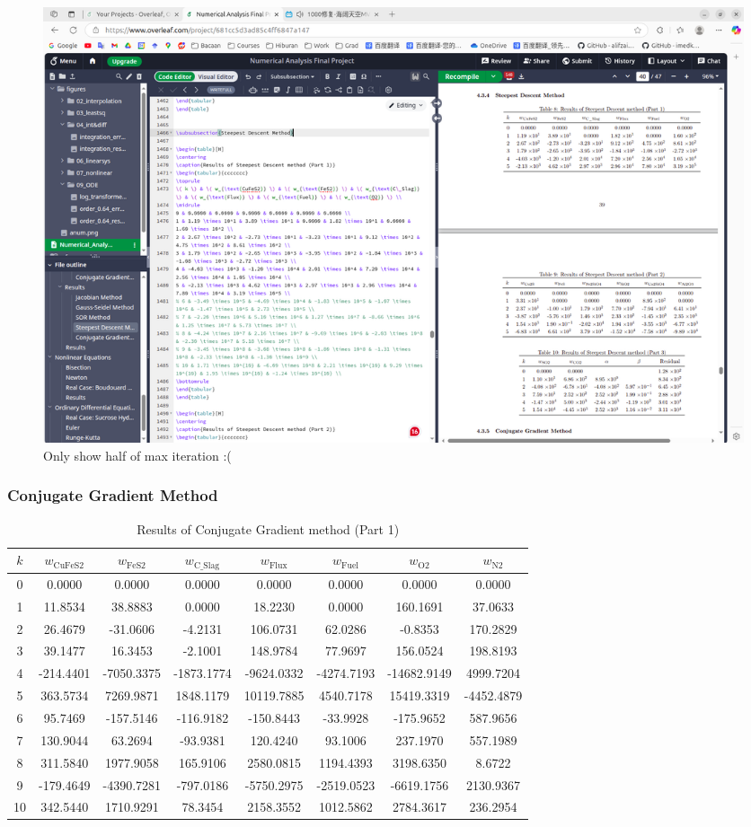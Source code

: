 \documentclass[10pt]{article}
\begin{document}
\begin{figure}[H]
    \centering
    \includegraphics[width=\linewidth]{figures/06_linearsys/Screenshot from 2025-05-18 19-59-09.png}
    \caption{Only show half of max iteration :(}
    \label{fig:enter-label}
\end{figure}




\subsubsection{Conjugate Gradient Method}


\begin{table}[H]
\centering
\caption{Results of Conjugate Gradient method (Part 1)}
\begin{tabular}{cccccccc}
\toprule
\( k \) & \( w_{\text{CuFeS2}} \) & \( w_{\text{FeS2}} \) & \( w_{\text{C\_Slag}} \) & \( w_{\text{Flux}} \) & \( w_{\text{Fuel}} \) & \( w_{\text{O2}} \) & \( w_{\text{N2}} \) \\
\midrule
0 & 0.0000 & 0.0000 & 0.0000 & 0.0000 & 0.0000 & 0.0000 & 0.0000 \\
1 & 11.8534 & 38.8883 & 0.0000 & 18.2230 & 0.0000 & 160.1691 & 37.0633 \\
2 & 26.4679 & -31.0606 & -4.2131 & 106.0731 & 62.0286 & -0.8353 & 170.2829 \\
3 & 39.1477 & 16.3453 & -2.1001 & 148.9784 & 77.9697 & 156.0524 & 198.8193 \\
4 & -214.4401 & -7050.3375 & -1873.1774 & -9624.0332 & -4274.7193 & -14682.9149 & 4999.7204 \\
5 & 363.5734 & 7269.9871 & 1848.1179 & 10119.7885 & 4540.7178 & 15419.3319 & -4452.4879 \\
6 & 95.7469 & -157.5146 & -116.9182 & -150.8443 & -33.9928 & -175.9652 & 587.9656 \\
7 & 130.9044 & 63.2694 & -93.9381 & 120.4240 & 93.1006 & 237.1970 & 557.1989 \\
8 & 311.5840 & 1977.9058 & 165.9106 & 2580.0815 & 1194.4393 & 3198.6350 & 8.6722 \\
9 & -179.4649 & -4390.7281 & -797.0186 & -5750.2975 & -2519.0523 & -6619.1756 & 2130.9367 \\
10 & 342.5440 & 1710.9291 & 78.3454 & 2158.3552 & 1012.5862 & 2784.3617 & 236.2954 \\
\bottomrule
\end{tabular}
\end{table}
\end{document}
